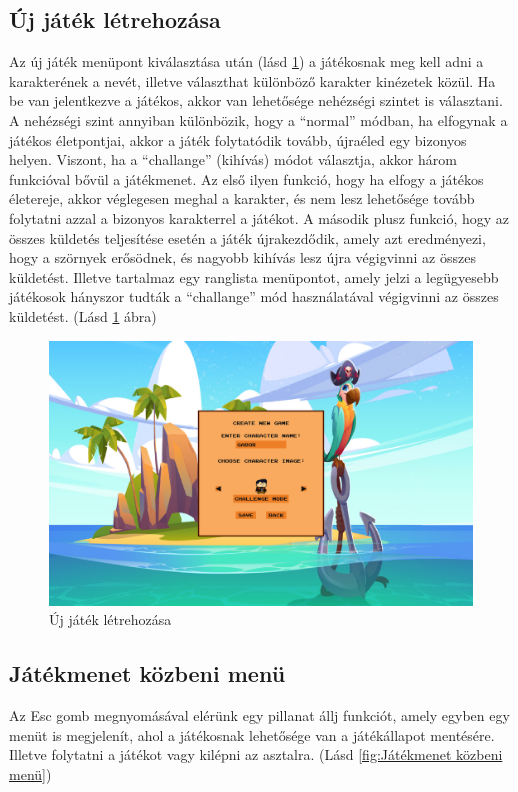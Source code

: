 \subsection{Új játék létrehozása}
\indent \indent Az új játék menüpont kiválasztása után (lásd \ref{fig:Új játék létrehozása}) a játékosnak meg kell adni a karakterének a nevét, illetve választhat különböző karakter kinézetek közül. Ha be van jelentkezve a játékos, akkor van lehetősége nehézségi szintet is választani.
A nehézségi szint annyiban különbözik, hogy a ``normal'' módban, ha elfogynak a játékos életpontjai, akkor a játék folytatódik tovább, újraéled egy bizonyos helyen. Viszont, ha a ``challange'' (kihívás) módot választja, akkor három funkcióval bővül a játékmenet. Az első ilyen funkció, hogy ha elfogy a játékos életereje, akkor véglegesen meghal a karakter, és nem lesz lehetősége tovább folytatni azzal a bizonyos karakterrel a játékot. A második plusz funkció, hogy az összes küldetés teljesítése esetén a játék újrakezdődik, amely azt eredményezi, hogy a szörnyek erősödnek, és nagyobb kihívás lesz újra végigvinni az összes küldetést. Illetve tartalmaz egy ranglista menüpontot, amely jelzi a legügyesebb játékosok hányszor tudták a ``challange'' mód használatával végigvinni az összes küldetést. (Lásd \ref{fig:Új játék létrehozása} ábra)

\begin{figure}[H]
    \centering
    \includegraphics[width=14.0truecm]{images/newgame.png}
    \caption{Új játék létrehozása}
    \label{fig:Új játék létrehozása}
\end{figure}

\subsection{Játékmenet közbeni menü}
\indent \indent Az Esc gomb megnyomásával elérünk egy pillanat állj funkciót, amely egyben egy menüt is megjelenít, ahol a játékosnak lehetősége van a játékállapot mentésére. Illetve folytatni a játékot vagy kilépni az asztalra. (Lásd \ref{fig:Játékmenet közbeni menü})

